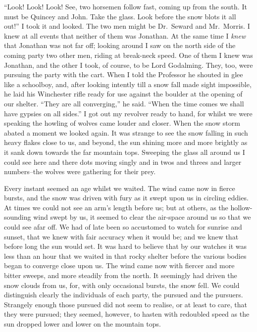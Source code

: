 \documentclass[12pt,openright]{book}
\begin{document}
“Look! Look! Look! See, two horsemen follow fast, coming up from the south. It must be Quincey and John. Take the glass. Look before the snow blots it all out!” I took it and looked. The two men might be Dr. Seward and Mr. Morris. I knew at all events that neither of them was Jonathan. At the same time I \textit{knew} that Jonathan was not far off; looking around I saw on the north side of the coming party two other men, riding at break-neck speed. One of them I knew was Jonathan, and the other I took, of course, to be Lord Godalming. They, too, were pursuing the party with the cart. When I told the Professor he shouted in glee like a schoolboy, and, after looking intently till a snow fall made sight impossible, he laid his Winchester rifle ready for use against the boulder at the opening of our shelter. “They are all converging,” he said. “When the time comes we shall have gypsies on all sides.” I got out my revolver ready to hand, for whilst we were speaking the howling of wolves came louder and closer. When the snow storm abated a moment we looked again. It was strange to see the snow falling in such heavy flakes close to us, and beyond, the sun shining more and more brightly as it sank down towards the far mountain tops. Sweeping the glass all around us I could see here and there dots moving singly and in twos and threes and larger numbers–the wolves were gathering for their prey.

Every instant seemed an age whilst we waited. The wind came now in fierce bursts, and the snow was driven with fury as it swept upon us in circling eddies. At times we could not see an arm’s length before us; but at others, as the hollow-sounding wind swept by us, it seemed to clear the air-space around us so that we could see afar off. We had of late been so accustomed to watch for sunrise and sunset, that we knew with fair accuracy when it would be; and we knew that before long the sun would set. It was hard to believe that by our watches it was less than an hour that we waited in that rocky shelter before the various bodies began to converge close upon us. The wind came now with fiercer and more bitter sweeps, and more steadily from the north. It seemingly had driven the snow clouds from us, for, with only occasional bursts, the snow fell. We could distinguish clearly the individuals of each party, the pursued and the pursuers. Strangely enough those pursued did not seem to realise, or at least to care, that they were pursued; they seemed, however, to hasten with redoubled speed as the sun dropped lower and lower on the mountain tops.
\end{document}
